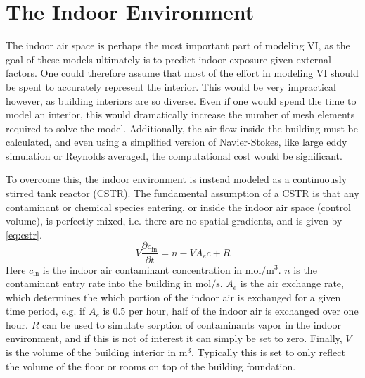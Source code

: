 \section{The Indoor Environment}\label{sec:indoor}

The indoor air space is perhaps the most important part of modeling VI, as the goal of these models ultimately is to predict indoor exposure given external factors.
One could therefore assume that most of the effort in modeling VI should be spent to accurately represent the interior.
This would be very impractical however, as building interiors are so diverse.
Even if one would spend the time to model an interior, this would dramatically increase the number of mesh elements required to solve the model.
Additionally, the air flow inside the building must be calculated, and even using a simplified version of Navier-Stokes, like large eddy simulation or Reynolds averaged, the computational cost would be significant.\par

To overcome this, the indoor environment is instead modeled as a continuously stirred tank reactor (CSTR).
The fundamental assumption of a CSTR is that any contaminant or chemical species entering, or inside the indoor air space (control volume), is perfectly mixed, i.e. there are no spatial gradients, and is given by \eqref{eq:cstr}.
\begin{equation}\label{eq:cstr}
  V\frac{\partial c_\mathrm{in}}{\partial t} = n - V A_e c + R
\end{equation}
Here $c_\mathrm{in}$ is the indoor air contaminant concentration in $\mathrm{mol/m^3}$.
$n$ is the contaminant entry rate into the building in $\mathrm{mol/s}$.
$A_e$ is the air exchange rate, which determines the which portion of the indoor air is exchanged for a given time period, e.g. if $A_e$ is 0.5 per hour, half of the indoor air is exchanged over one hour.
$R$ can be used to simulate sorption of contaminants vapor in the indoor environment, and if this is not of interest it can simply be set to zero.
Finally, $V$ is the volume of the building interior in $\mathrm{m^3}$.
Typically this is set to only reflect the volume of the floor or rooms on top of the building foundation.\par


